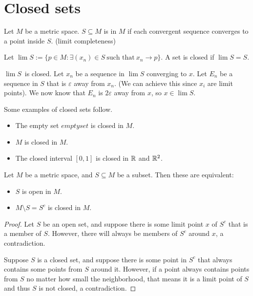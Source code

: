 \documentclass[11pt]{scrreport}
\begin{document}
\section{Closed sets}
\begin{definition}
    Let $M$ be a metric space. $S\subseteq M$ is  in $M$ if each convergent sequence converges to a point inside $S$. (limit completeness) 
\end{definition}
Let $\lim S := \{p\in M : \exists (x_n)\in S \ \text{such that} \ x_n\to p\}.$ A set is closed if $\lim S = S$.
\begin{remark}
    $\lim S$ is closed. Let $x_n$ be a sequence in $\lim S$ converging to $x$. Let $E_n$ be a sequence in $S$ that is $\varepsilon$ away from $x_n$. (We can achieve this since $x_i$ are limit points). We now know that $E_n$ is $2\varepsilon$ away from $x$, so $x\in \lim S$.
\end{remark}
\begin{example}
    Some examples of closed sets follow.
    \begin{itemize}
        \item The empty set $emptyset$ is closed in $M$.
        \item $M$ is closed in $M$.
        \item The closed interval $[0,1]$ is closed in $\mathbb R$ and $\mathbb R^2$.
    \end{itemize}
\end{example}
\begin{theorem}
    Let $M$ be a metric space, and $S\subseteq M$ be a subset. Then these are equivalent:
    \begin{itemize}
        \item $S$ is open in $M$.
        \item $M\setminus S = S^c$ is closed in $M$.
    \end{itemize}
\end{theorem}
\begin{proof}
    Let $S$ be an open set, and suppose there is some limit point $x$ of $S^c$ that is a member of $S$. However, there will always be members of $S^c$ around $x$, a contradiction.

    Suppose $S$ is a closed set, and suppose there is some point in $S^c$ that always contains some points from $S$ around it. However, if a point always contains points from $S$ no matter how small the neighborhood, that means it is a limit point of $S$ and thus $S$ is not closed, a contradiction.
\end{proof}
\end{document}
